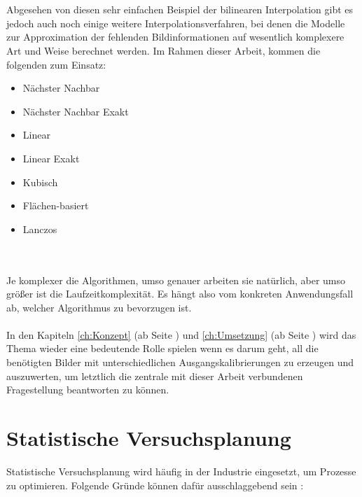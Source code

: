 \documentclass[
fontsize=10pt, 
listof = totoc,
parskip = half	
]{report}
\begin{document}
\\\\
\noindent Abgesehen von diesen sehr einfachen Beispiel der bilinearen Interpolation gibt es jedoch auch noch einige weitere Interpolationsverfahren, bei denen die Modelle zur Approximation der fehlenden Bildinformationen auf wesentlich komplexere Art und Weise berechnet werden. Im Rahmen dieser Arbeit, kommen die folgenden zum Einsatz:
\begin{minipage}[t]{0.5\linewidth}\vspace{0pt}
	\begin{itemize}
		\item Nächster Nachbar
		\item Nächster Nachbar Exakt
		\item Linear
		\item Linear Exakt
	\end{itemize}
\end{minipage}
\begin{minipage}[t]{0.49\linewidth}\vspace{0pt}
	\begin{itemize}
		\item Kubisch
		\item Flächen-basiert
		\item Lanczos
	\end{itemize}
\end{minipage}
\\\\
\noindent Je komplexer die Algorithmen, umso genauer arbeiten sie natürlich, aber umso größer ist die Laufzeitkomplexität. Es hängt also vom konkreten Anwendungsfall ab, welcher Algorithmus zu bevorzugen ist.
\\\\
\noindent In den Kapiteln \ref{ch:Konzept} (ab Seite \pageref{ch:Konzept}) und \ref{ch:Umsetzung} (ab Seite \pageref{ch:Umsetzung}) wird das Thema wieder eine bedeutende Rolle spielen wenn es darum geht, all die benötigten Bilder mit unterschiedlichen Ausgangskalibrierungen zu erzeugen und auszuwerten, um letztlich die zentrale mit dieser Arbeit verbundenen Fragestellung beantworten zu können.

\section{Statistische Versuchsplanung}
\label{sec:StatVersPlanung}
Statistische Versuchsplanung wird häufig in der Industrie eingesetzt, um Prozesse zu optimieren. Folgende Gründe können dafür ausschlaggebend sein \cite{kleppmann_2020}:
\end{document}

